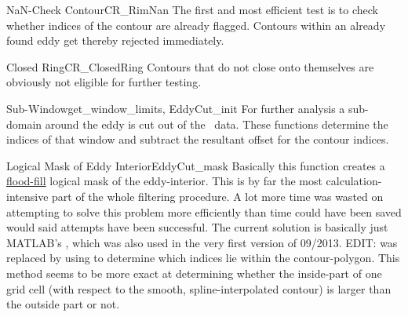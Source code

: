 \begin{filter}{NaN-Check Contour}{CR_RimNan}
The first and most efficient test is to check whether indices of the
contour are already flagged. Contours within an already found eddy get thereby
rejected immediately.
\end{filter}\newline
\begin{filter}{Closed Ring}{CR_ClosedRing}
Contours that do not close onto themselves are obviously not eligible for
further testing.
\end{filter}\newline
\begin{filter}{Sub-Window}{get_window_limits, EddyCut_init}
For further analysis a sub-domain around the eddy is cut out of the \SSH~data.
These functions determine the indices of that window and subtract the
resultant offset for the contour indices.
\end{filter}\newline
\begin{filter}{Logical Mask of Eddy Interior}{EddyCut_mask}
\label{filter:cutmask}
Basically this function creates a \href{http://en.wikipedia.org/wiki/Flood_fill}{flood-fill} logical mask of the
eddy-interior. This is by far the most calculation-intensive part of the whole
filtering procedure. A lot more time was wasted on attempting to solve this
problem more efficiently than time could have been saved would said attempts
have
been successful. The current solution is basically just MATLAB's , which was also used in the very first version of 09/2013.
EDIT:  was replaced by using  to determine which indices lie within the contour-polygon. This method seems to be more exact at determining whether the inside-part of one grid cell (with respect to the smooth, spline-interpolated contour) is larger than the outside part or not.
\end{filter}\newline
